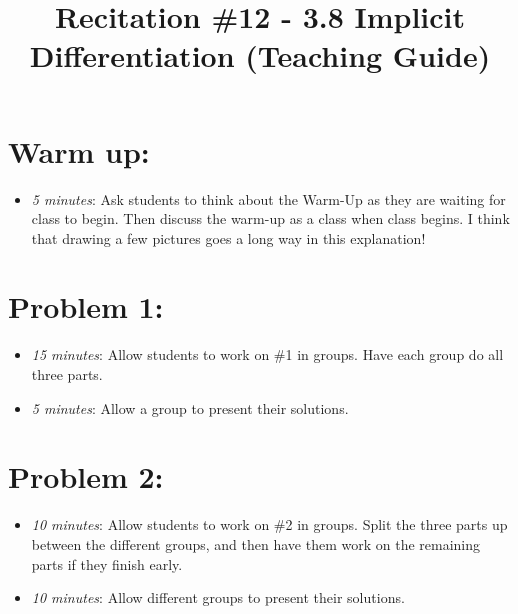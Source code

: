 \documentclass[handout,nooutcomes]{ximera}
\title{Recitation \#12 - 3.8 Implicit Differentiation (Teaching Guide)}
\begin{document}
\begin{abstract}		\end{abstract}
\maketitle


\section*{Warm up:} 
	
	\begin{itemize}
	
	\item  \emph{5 minutes}:  Ask students to think about the Warm-Up as they are waiting for class to begin.  Then discuss the warm-up as a class when class begins.  I think that drawing a few pictures goes a long way in this explanation!
	
	
	
	\end{itemize}


\section*{Problem 1:}

	\begin{itemize}
	
	\item  \emph{15 minutes}:  Allow students to work on \#1 in groups.  Have each group do all three parts.
	
	\item  \emph{5 minutes}:  Allow a group to present their solutions.
	
	\end{itemize}



\section*{Problem 2:}

	\begin{itemize}
	
	\item  \emph{10 minutes}:  Allow students to work on \#2 in groups.  Split the three parts up between the different groups, and then have them work on the remaining parts if they finish early.
		
	\item  \emph{10 minutes}:  Allow different groups to present their solutions.
				
	\end{itemize}
	
\end{document}
